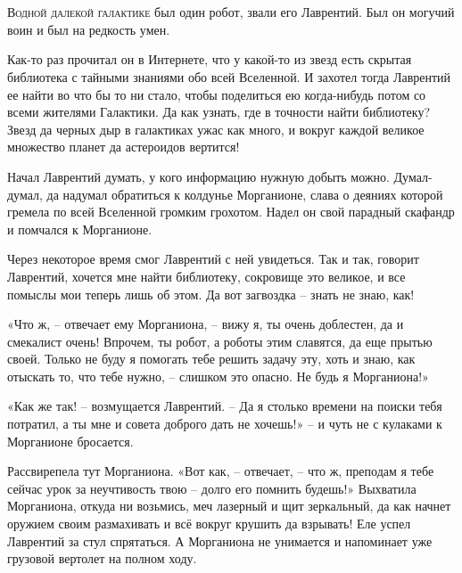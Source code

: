 \documentclass[ebook,oneside,final,openright]{memoir}
\begin{document}
\chapter{}
 \lettrine{В}{одной далекой галактике} был один робот, звали его Лаврентий. Был он могучий воин и был на редкость умен.\par
\par
Как-то раз прочитал он в Интернете, что у какой-то из звезд есть скрытая библиотека с тайными знаниями обо всей Вселенной. И захотел тогда Лаврентий ее найти во что бы то ни стало, чтобы поделиться ею когда-нибудь потом со всеми жителями Галактики. Да как узнать, где в точности найти библиотеку? Звезд да черных дыр в галактиках ужас как много, и вокруг каждой великое множество планет да астероидов вертится!\par
\par
Начал Лаврентий думать, у кого информацию нужную добыть можно. Думал-думал, да надумал обратиться к колдунье Морганионе, слава о деяниях которой гремела по всей Вселенной громким грохотом. Надел он свой парадный скафандр и помчался к Морганионе.\par
\par
Через некоторое время смог Лаврентий с ней увидеться. Так и так, говорит Лаврентий, хочется мне найти библиотеку, сокровище это великое, и все помыслы мои теперь лишь об этом. Да вот загвоздка – знать не знаю, как!\par
\par
«Что ж, – отвечает ему Морганиона, – вижу я, ты очень доблестен, да и смекалист очень! Впрочем, ты робот, а роботы этим славятся, да еще прытью своей. Только не буду я помогать тебе решить задачу эту, хоть и знаю, как отыскать то, что тебе нужно, – слишком это опасно. Не будь я Морганиона!» \par
\par
«Как же так! – возмущается Лаврентий. – Да я столько времени на поиски тебя потратил, а ты мне и совета доброго дать не хочешь!» – и чуть не с кулаками к Морганионе бросается. \par
\par
Рассвирепела тут Морганиона. «Вот как, – отвечает, – что ж, преподам я тебе сейчас урок за неучтивость твою – долго его помнить будешь!» Выхватила Морганиона, откуда ни возьмись, меч лазерный и щит зеркальный, да как начнет оружием своим размахивать и всё вокруг крушить да взрывать! Еле успел Лаврентий за стул спрятаться. А Морганиона не унимается и напоминает уже грузовой вертолет на полном ходу. \par
\end{document}
